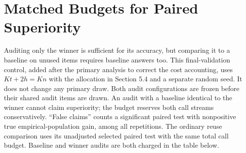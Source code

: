 \documentclass{article}
\begin{document}
\begin{table}[h]
\caption{All synthetic settings. Each row uses 4,000 repetitions. The true gain over the baseline is zero for every candidate.}
\centering\small
\end{table}
\clearpage
\begin{table}[h]
\caption{All real empirical-population replay settings. Each row uses 4,000 repetitions. The candidate order is fixed and nested, with candidate 0 always included.}
\centering\small
\end{table}

\begin{table}[h]
\caption{Equal-question comparison: half of a fixed total question budget tunes all candidates; half audits only the winner. The change in selected quality is relative to exhaustive reuse of all questions with $K=24$.}
\centering\small
\end{table}

\section{Matched Budgets for Paired Superiority}
Auditing only the winner is sufficient for its accuracy, but comparing it to a baseline on unused items requires baseline answers too. This final-validation control, added after the primary analysis to correct the cost accounting, uses $Kt+2h=Kn$ with the allocation in Section 5.4 and a separate random seed. It does not change any primary draw. Both audit configurations are frozen before their shared audit items are drawn. An audit with a baseline identical to the winner cannot claim superiority; the budget reserves both call streams conservatively. ``False claims'' counts a significant paired test with nonpositive true empirical-population gain, among all repetitions. The ordinary reuse comparison uses its unadjusted selected paired test with the same total call budget. Baseline and winner audits are both charged in the table below.
\begin{table}[h]
\caption{Paired decisions at exactly matched model-call budgets, $K=24$, 4,000 repetitions. The audit count is per configuration, so the audit costs twice that number of calls. False-claim frequencies and selected accuracy are percent $\pm1$ MCSE. Mixed true and null candidates mean these unconditional frequencies are not conditional type-I errors among only null selections.}
\centering\small
\end{table}
\end{document}
